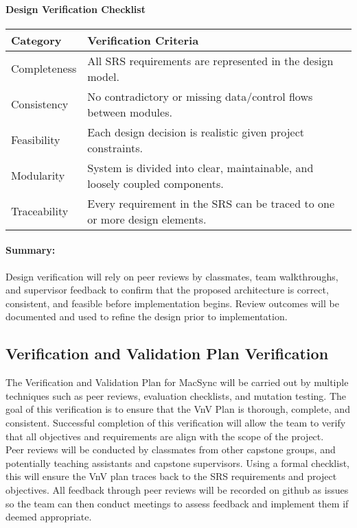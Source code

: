 \documentclass[12pt, titlepage]{article}
\begin{document}
\paragraph{Design Verification Checklist}
\begin{center}
\begin{tabular}{|p{4cm}|p{9cm}|}
\hline
\textbf{Category} & \textbf{Verification Criteria} \\ \hline
Completeness & All SRS requirements are represented in the design model. \\ \hline
Consistency & No contradictory or missing data/control flows between modules. \\ \hline
Feasibility & Each design decision is realistic given project constraints. \\ \hline
Modularity & System is divided into clear, maintainable, and loosely coupled components. \\ \hline
Traceability & Every requirement in the SRS can be traced to one or more design elements. \\ \hline
\end{tabular}
\end{center}

\paragraph{Summary:}
Design verification will rely on peer reviews by classmates, team walkthroughs, and supervisor feedback to confirm that the proposed architecture is correct, consistent, and feasible before implementation begins. Review outcomes will be documented and used to refine the design prior to implementation.

\subsection{Verification and Validation Plan Verification}

The Verification and Validation Plan for MacSync will be carried out by multiple techniques such as peer reviews, evaluation checklists, and mutation testing. The goal of this verification is to ensure that the VnV Plan is thorough, complete, and consistent. Successful completion of this verification will allow the team to verify that all objectives and requirements are align with the scope of the project.\\

Peer reviews will be conducted by classmates from other capstone groups, and potentially teaching assistants and capstone supervisors. Using a formal checklist, this will ensure the VnV plan traces back to the SRS requirements and project objectives. All feedback through peer reviews will be recorded on github as issues so the team can then conduct meetings to assess feedback and implement them if deemed appropriate.\\
\end{document}
